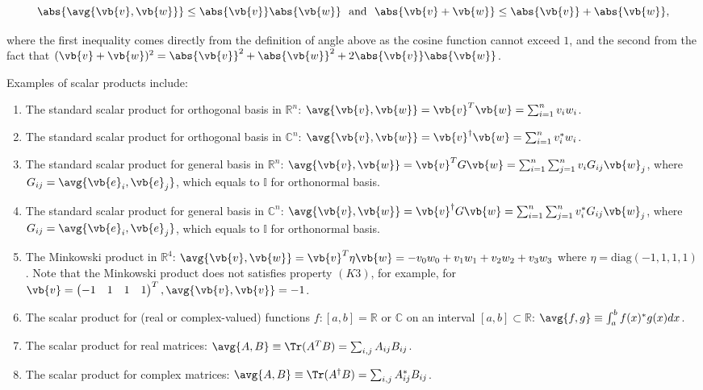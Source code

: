 \documentclass[a4paper,12pt]{report}
\begin{document}
\begin{equation}
    \abs{\avg{\vb{v} ,\vb{w} } } \le \abs{\vb{v} }\abs{\vb{w} } ~\text { and }~  \abs{\vb{v} + \vb{w} } \le \abs{\vb{v} } + \abs{\vb{w} },      
\end{equation}


where the first inequality comes directly from the definition of angle above as the cosine function cannot exceed \(1\), and the second from the fact that \((\vb{v} +\vb{w} )^2 = \abs{\vb{v} }^2+\abs{\vb{w} }^2 + 2\abs{\vb{v} }\abs{\vb{w} }     \). 

Examples of scalar products include:

\begin{enumerate}
    \item The standard scalar product for orthogonal basis in \(\mathbb{R}^{n} \): \(\avg{\vb{v} ,\vb{w} }  = \vb{v} ^T \vb{w} = \sum_{i=1}^{n} v_{i} w_{i} \).  
    \item The standard scalar product for orthogonal basis in \(\mathbb{C}^{n} \): \(\avg{\vb{v} ,\vb{w} } = \vb{v} ^{\dagger} \vb{w} = \sum_{i=1}^{n} v_{i}^*w_{i} \).
    \item The standard scalar product for general basis in \(\mathbb{R}^{n} \): \(\avg{\vb{v} ,\vb{w} } = \vb{v} ^T G\vb{w} = \sum_{i=1}^{n} \sum_{j=1}^{n}  v_{i}G_{ij}\vb{w} _{j}   \), where \(G_{ij} = \avg{\vb{e} _{i}, \vb{e} _{j}  }  \), which equals to \(\mathbb{I}\) for orthonormal basis.
    \item The standard scalar product for general basis in \(\mathbb{C}^{n} \): \(\avg{\vb{v} ,\vb{w} } = \vb{v} ^{\dagger}  G\vb{w} = \sum_{i=1}^{n} \sum_{j=1}^{n}  v_{i}^*G_{ij}\vb{w} _{j}   \), where \(G_{ij} = \avg{\vb{e} _{i}, \vb{e} _{j}  }  \), which equals to \(\mathbb{I}\) for orthonormal basis.
    \item The Minkowski product in \(\mathbb{R}^{4} \): \(\avg{\vb{v} ,\vb{w} } = \vb{v} ^{T} \eta \vb{w} = -v_0 w_0 + v_1 w_1 +v_2 w_2 +v_3 w_3    \) where \(\eta = \text{diag}  (-1,1,1,1)\). Note that the Minkowski product does not satisfies property \((K3)\), for example, for \(\vb{v} = \begin{pmatrix}
        -1 & 1 & 1 &  1 \\
    \end{pmatrix}^{T} , \avg{\vb{v} ,\vb{v} }  = -1\).
    \item The scalar product for (real or complex-valued) functions \(f: [a,b] = \mathbb{R}\text { or } \mathbb{C}\) on an interval \([a,b] \subset \mathbb{R}\): \(\avg{f,g} \equiv \int_{a}^{b} f(x)^{*} g(x)dx\). 
    \item The scalar product for real matrices: \(\avg{A, B} \equiv \Tr (A^{T}B ) = \sum_{i,j}^{} A_{ij} B_{ij}\).
    \item The scalar product for complex matrices: \(\avg{A, B} \equiv \Tr (A^{\dagger} B ) = \sum_{i,j}^{} A_{ij}^* B_{ij}\).
\end{enumerate}
\end{document}
